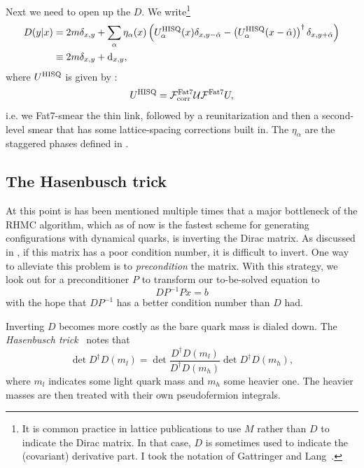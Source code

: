 Next we need to open up the $D$. We write\footnote{It is common practice in
lattice publications to use $M$ rather than $D$ to indicate the Dirac matrix.
In that case, $D$ is sometimes used to indicate the (covariant) derivative part.
I took the notation of Gattringer and Lang~\cite{gattringer_quantum_2010}.}
\begin{equation}\begin{aligned}
D(y|x)&=2m\delta_{x,y}
+\sum_\alpha \eta_\alpha(x)\left(U^{\rm HISQ}_\alpha(x)\delta_{x,y-\hat\alpha}
-\left(U^{\rm HISQ}_\alpha(x-\hat\alpha)\right)^\dagger\delta_{x,y+\hat\alpha}\right)\\
&\equiv 2m\delta_{x,y}+\dd_{x,y},
\end{aligned}\end{equation}
where $U^{\rm HISQ}$ is given by :
\begin{equation}
U^{\rm HISQ}=\mathcal{F}^{\rm Fat7}_{\rm corr}\mathcal{U}\mathcal{F}^{\rm Fat7}U,
\end{equation} 
i.e. we Fat7-smear the thin link, followed
by a reunitarization and then a second-level smear that has some lattice-spacing
corrections built in. The $\eta_\alpha$ are the
staggered phases defined in .

\subsection{The Hasenbusch trick}

At this point is has been mentioned multiple times that a major bottleneck
of the RHMC algorithm, which as of now is the fastest scheme for
generating configurations with dynamical quarks, is inverting the
Dirac matrix. As discussed in , if this matrix
has a poor condition number, it is difficult to invert.
One way to alleviate this problem is to {\it
precondition} the matrix. With this strategy,
we look out for a preconditioner $P$ to transform our to-be-solved equation to
\begin{equation}
DP^{-1}Px=b
\end{equation}
with the hope that $DP^{-1}$ has a better condition number than $D$ had.

Inverting $D$ becomes more costly as the bare quark mass is dialed down.
The {\it Hasenbusch trick}~\cite{hasenbusch_speeding_2001,urbach_hmc_2006}
notes that
\begin{equation}
\det D^{\dagger} D\left(m_l\right)=\det \frac{D^{\dagger}
D\left(m_l\right)}{D^{\dagger} D\left(m_h\right)} \det D^{\dagger}
D\left(m_h\right),
\end{equation}
where $m_l$ indicates some light quark mass and $m_h$ some heavier one.
The heavier masses are then treated with their own pseudofermion integrals.

